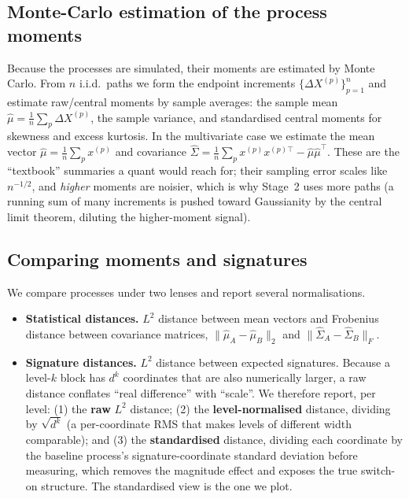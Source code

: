 \documentclass[11pt]{article}
\begin{document}
\subsection{Monte-Carlo estimation of the process moments}
Because the processes are simulated, their moments are estimated by Monte Carlo.
From $n$ i.i.d.\ paths we form the endpoint increments $\{\Delta X^{(p)}\}_{p=1}^n$
and estimate raw/central moments by sample averages: the sample mean
$\hat\mu=\frac1n\sum_p\Delta X^{(p)}$, the sample variance, and standardised
central moments for skewness and excess kurtosis. In the multivariate case we
estimate the mean vector $\hat\mu=\frac1n\sum_p x^{(p)}$ and covariance
$\widehat\Sigma=\frac1n\sum_p x^{(p)}x^{(p)\top}-\hat\mu\hat\mu^{\top}$. These are
the ``textbook'' summaries a quant would reach for; their sampling error scales
like $n^{-1/2}$, and \emph{higher} moments are noisier, which is why Stage~2 uses
more paths (a running sum of many increments is pushed toward Gaussianity by the
central limit theorem, diluting the higher-moment signal).

\subsection{Comparing moments and signatures}\label{sec:measures}
We compare processes under two lenses and report several normalisations.
\begin{itemize}
  \item \textbf{Statistical distances.} $L^2$ distance between mean vectors and
        Frobenius distance between covariance matrices,
        $\|\hat\mu_A-\hat\mu_B\|_2$ and
        $\|\widehat\Sigma_A-\widehat\Sigma_B\|_F$.
  \item \textbf{Signature distances.} $L^2$ distance between expected signatures.
        Because a level-$k$ block has $d^{k}$ coordinates that are also
        numerically larger, a raw distance conflates ``real difference'' with
        ``scale''. We therefore report, per level: (1) the \textbf{raw} $L^2$
        distance; (2) the \textbf{level-normalised} distance, dividing by
        $\sqrt{d^{k}}$ (a per-coordinate RMS that makes levels of different width
        comparable); and (3) the \textbf{standardised} distance, dividing each
        coordinate by the baseline process's signature-coordinate standard
        deviation before measuring, which removes the magnitude effect and
        exposes the true switch-on structure. The standardised view is the one we
        plot.
\end{itemize}
\end{document}
